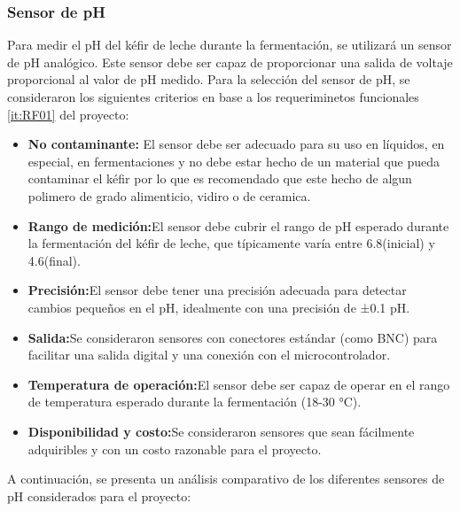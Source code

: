 \subsubsection{Sensor de pH}
Para medir el pH del kéfir de leche durante la fermentación, se
utilizará un sensor de pH analógico. Este sensor debe ser capaz de proporcionar
una salida de voltaje proporcional al valor de pH medido.
Para la selección del sensor de pH, se consideraron los siguientes
criterios en base a los requeriminetos funcionales \ref{it:RF01} del
proyecto:
\begin{itemize}
    \item \textbf{No contaminante:} El sensor debe ser adecuado para su uso en
    líquidos, en especial, en fermentaciones y no debe estar hecho de un material que pueda
    contaminar el kéfir por lo que es recomendado que este hecho de algun polimero de grado alimenticio, vidiro o de ceramica.
    \item \textbf{Rango de medición:}El sensor debe cubrir el rango de pH esperado durante
    la fermentación del kéfir de leche, que típicamente varía entre 6.8(inicial) y
    4.6(final).
    \item \textbf{Precisión:}El sensor debe tener una precisión adecuada para detectar
    cambios pequeños en el pH, idealmente con una precisión de ±0.1 pH.
    \item \textbf{Salida:}Se consideraron sensores con conectores estándar (como BNC)
    para facilitar una salida digital y una conexión con el microcontrolador.
    \item \textbf{Temperatura de operación:}El sensor debe ser capaz de operar en el
    rango de temperatura esperado durante la fermentación (18-30 °C).
    \item \textbf{Disponibilidad y costo:}Se consideraron sensores que sean fácilmente
    adquiribles y con un costo razonable para el proyecto.
\end{itemize}
A continuación, se presenta un análisis comparativo de los diferentes sensores de pH considerados para el proyecto:


